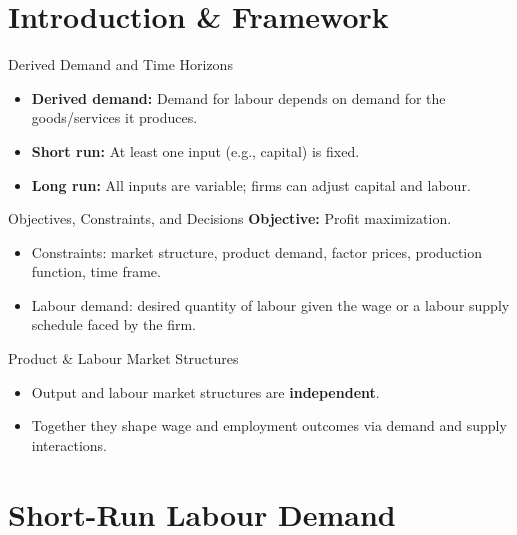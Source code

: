 \documentclass[aspectratio=169]{beamer}
\begin{document}
\section{Introduction \& Framework}

\begin{frame}{Derived Demand and Time Horizons}
\transfade
\begin{itemize}[<+->]
  \item \textbf{Derived demand:} Demand for labour depends on demand for the goods/services it produces.
  \item \textbf{Short run:} At least one input (e.g., capital) is fixed.
  \item \textbf{Long run:} All inputs are variable; firms can adjust capital and labour.
\end{itemize}
\end{frame}

\begin{frame}{Objectives, Constraints, and Decisions}
\transfade
\textbf{Objective:} Profit maximization.
\begin{itemize}[<+->]
  \item Constraints: market structure, product demand, factor prices, production function, time frame.
  \item Labour demand: desired quantity of labour given the wage or a labour supply schedule faced by the firm.
\end{itemize}
\end{frame}

\begin{frame}{Product \& Labour Market Structures}
\transfade
\begin{itemize}[<+->]
  \item Output and labour market structures are \textbf{independent}.
  \item Together they shape wage and employment outcomes via demand and supply interactions.
\end{itemize}
\end{frame}

\section{Short-Run Labour Demand}
\end{document}
